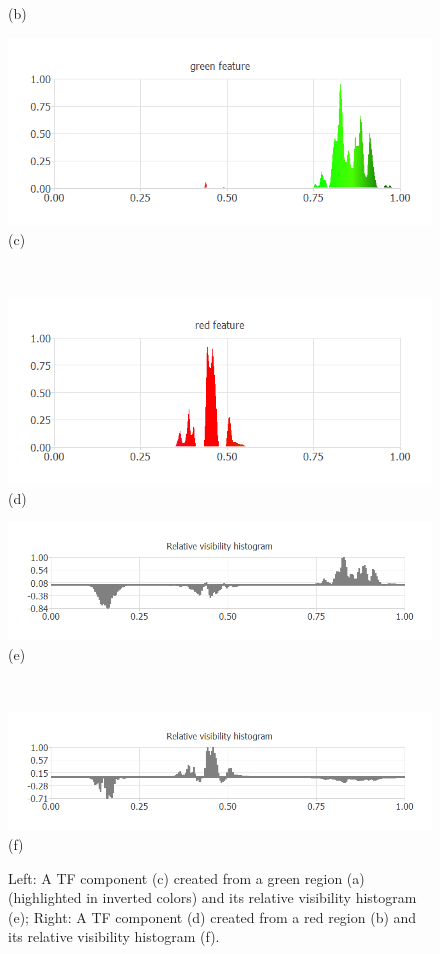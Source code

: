 \documentclass[twoside,twocolumn,10pt]{article}
\begin{document}
\begin{figure}
\begin{minipage}{.16\textwidth}
(b)
	\end{minipage}
	\begin{minipage}{.16\textwidth}
	\centering
	\includegraphics[width=1\linewidth]{nucleon_Green_feature}
(c)
	\end{minipage}~
	\begin{minipage}{.16\textwidth}
		\centering
		\includegraphics[width=1\linewidth]{nucleon_Red_feature}
(d)
	\end{minipage}
	\begin{minipage}{.16\textwidth}
		\centering
		\includegraphics[width=1\linewidth]{nucleon_green_Relative_visibility_histogram}
(e)
	\end{minipage}~
	\begin{minipage}{.16\textwidth}
		\centering
		\includegraphics[width=1\linewidth]{nucleon_red_Relative_visibility_histogram}
(f)
	\end{minipage}
	\caption{Left: A TF component (c) created from a green region (a) (highlighted in inverted colors) and its relative visibility histogram (e); Right: A TF component (d) created from a red region (b) and its relative visibility histogram (f).}
	\label{fig:nucleon_features}
\end{figure}
\end{document}
